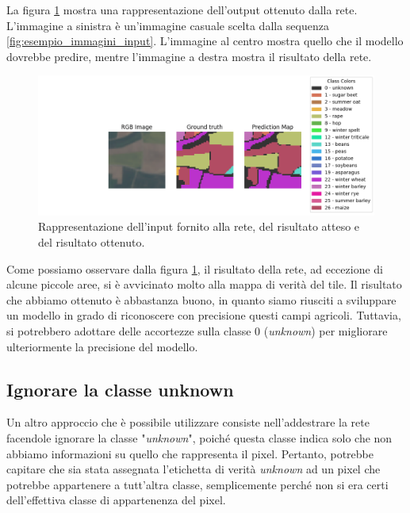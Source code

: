 La figura \ref{fig:Esempio_di_output} mostra una rappresentazione dell'output 
ottenuto dalla rete. L'immagine a sinistra è un'immagine casuale scelta dalla 
sequenza \ref{fig:esempio_immagini_input}. L'immagine al centro mostra quello che il 
modello dovrebbe predire, mentre l'immagine a destra mostra il risultato della rete.

\begin{figure}[H]
    \centering
    \includegraphics[width=1\textwidth]{Immagini/sperimentazione/LABEL_noIgnore_Edit.png}
    \caption{Rappresentazione dell'input fornito alla rete, del risultato atteso e del risultato ottenuto.}
    \label{fig:Esempio_di_output}
\end{figure}


Come possiamo osservare dalla figura \ref{fig:Esempio_di_output}, il risultato della rete, 
ad eccezione di alcune piccole aree, si è avvicinato molto alla mappa di verità del tile.
Il risultato che abbiamo ottenuto è abbastanza buono, in quanto siamo riusciti a sviluppare un 
modello in grado di riconoscere con precisione questi campi agricoli.
Tuttavia, si potrebbero adottare delle accortezze sulla classe 0 (\textit{unknown}) 
per migliorare ulteriormente la precisione del modello.



\subsection{Ignorare la classe unknown}
Un altro approccio che è possibile utilizzare consiste nell'addestrare la 
rete facendole ignorare la classe "\textit{unknown}", poiché questa classe indica 
solo che non abbiamo informazioni su quello che rappresenta il pixel. Pertanto, potrebbe 
capitare che sia stata assegnata l'etichetta di verità \textit{unknown} ad un pixel che 
potrebbe appartenere a tutt'altra classe, semplicemente perché non si 
era certi dell'effettiva classe di appartenenza del pixel.

